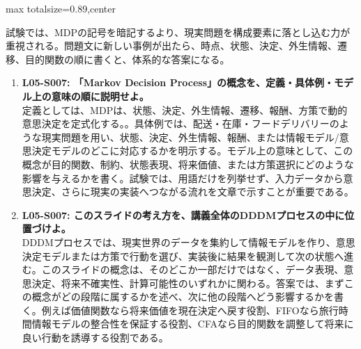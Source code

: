 \begin{minipage}[t]{0.58\textwidth}
\begin{adjustbox}{max totalsize={\textwidth}{0.89\textheight},center}
\begin{minipage}{\textwidth}
試験では、MDPの記号を暗記するより、現実問題を構成要素に落とし込む力が重視される。問題文に新しい事例が出たら、時点、状態、決定、外生情報、遷移、目的関数の順に書くと、体系的な答案になる。\par{}\begin{enumerate}\item \textbf{L05-S007: 「Markov Decision Process」の概念を、定義・具体例・モデル上の意味の順に説明せよ。}\\定義としては、MDPは、状態、決定、外生情報、遷移、報酬、方策で動的意思決定を定式化する。。具体例では、配送・在庫・フードデリバリーのような現実問題を用い、状態、決定、外生情報、報酬、または情報モデル/意思決定モデルのどこに対応するかを明示する。モデル上の意味として、この概念が目的関数、制約、状態表現、将来価値、または方策選択にどのような影響を与えるかを書く。試験では、用語だけを列挙せず、入力データから意思決定、さらに現実の実装へつながる流れを文章で示すことが重要である。\item \textbf{L05-S007: このスライドの考え方を、講義全体のDDDMプロセスの中に位置づけよ。}\\DDDMプロセスでは、現実世界のデータを集約して情報モデルを作り、意思決定モデルまたは方策で行動を選び、実装後に結果を観測して次の状態へ進む。このスライドの概念は、そのどこか一部だけではなく、データ表現、意思決定、将来不確実性、計算可能性のいずれかに関わる。答案では、まずこの概念がどの段階に属するかを述べ、次に他の段階へどう影響するかを書く。例えば価値関数なら将来価値を現在決定へ戻す役割、FIFOなら旅行時間情報モデルの整合性を保証する役割、CFAなら目的関数を調整して将来に良い行動を誘導する役割である。\end{enumerate}
\end{minipage}
\end{adjustbox}
\end{minipage}



